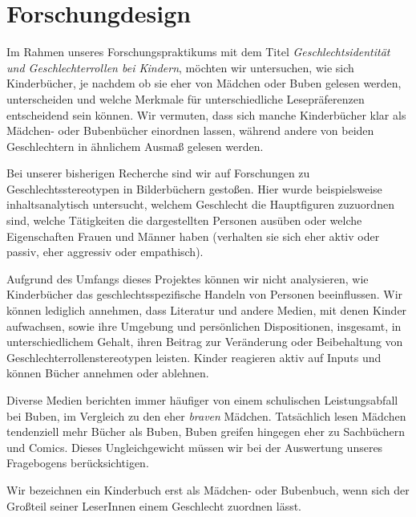 
\section{Forschungdesign}

  Im Rahmen unseres Forschungspraktikums mit dem Titel
  \emph{Geschlechtsidentität und Geschlechterrollen bei Kindern}, möchten wir
  untersuchen, wie sich Kinderbücher, je nachdem ob sie eher von Mädchen oder
  Buben gelesen werden, unterscheiden und welche Merkmale für unterschiedliche
  Lesepräferenzen entscheidend sein können. Wir vermuten, dass sich manche
  Kinderbücher klar als Mädchen- oder Bubenbücher einordnen lassen, während
  andere von beiden Geschlechtern in ähnlichem Ausmaß gelesen werden.

  Bei unserer bisherigen Recherche sind wir auf Forschungen zu
  Geschlechtsstereotypen in Bilderbüchern gestoßen. Hier wurde beispielsweise
  inhaltsanalytisch untersucht, welchem Geschlecht die Hauptfiguren zuzuordnen
  sind, welche Tätigkeiten die dargestellten Personen ausüben oder welche
  Eigenschaften Frauen und Männer haben (verhalten sie sich eher aktiv oder
  passiv, eher aggressiv oder empathisch). \parencite{Schmerl1988}

  Aufgrund des Umfangs dieses Projektes können wir nicht analysieren, wie
  Kinderbücher das geschlechtsspezifische Handeln von Personen beeinflussen. Wir
  können lediglich annehmen, dass Literatur und andere Medien, mit denen Kinder
  aufwachsen, sowie ihre Umgebung und persönlichen Dispositionen, insgesamt, in
  unterschiedlichem Gehalt, ihren Beitrag zur Veränderung oder Beibehaltung von
  Geschlechterrollenstereotypen leisten. Kinder reagieren aktiv auf Inputs und
  können Bücher annehmen oder ablehnen.

  Diverse Medien berichten immer häufiger von einem schulischen Leistungsabfall
  bei Buben, im Vergleich zu den eher \emph{braven} Mädchen. Tatsächlich lesen
  Mädchen tendenziell mehr Bücher als Buben, Buben greifen hingegen eher zu
  Sachbüchern und Comics. Dieses Ungleichgewicht müssen wir bei der Auswertung
  unseres Fragebogens berücksichtigen.

     Wir bezeichnen ein Kinderbuch erst als Mädchen- oder
Bubenbuch, wenn sich der Großteil seiner LeserInnen einem Geschlecht zuordnen
lässt.


